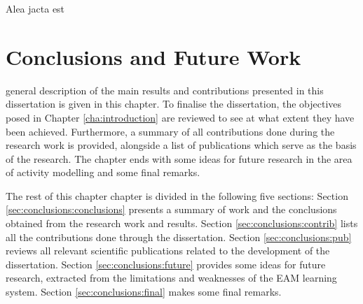

\begin{savequote}[50mm]
Alea jacta est
\end{savequote}


\chapter{Conclusions and Future Work}
\label{cha:conclusions}

\ifpdf
    \graphicspath{{7_conclusions/figures/PDF/}{7_conclusions/figures/PNG/}{7_conclusions/figures/}}
\else
    \graphicspath{{7_conclusions/figures/EPS/}{7_conclusions/figures/}}
\fi

 general description of the main results and contributions presented in this dissertation is given in this chapter. To finalise the dissertation, the objectives posed in Chapter \ref{cha:introduction} are reviewed to see at what extent they have been achieved. Furthermore, a summary of all contributions done during the research work is provided, alongside a list of publications which serve as the basis of the research. The chapter ends with some ideas for future research in the area of activity modelling and some final remarks.

The rest of this chapter chapter is divided in the following five sections: Section \ref{sec:conclusions:conclusions} presents a summary of work and the conclusions obtained from the research work and results. Section \ref{sec:conclusions:contrib} lists all the contributions done through the dissertation. Section \ref{sec:conclusions:pub} reviews all relevant scientific publications related to the development of the dissertation. Section \ref{sec:conclusions:future} provides some ideas for future research, extracted from the limitations and weaknesses of the EAM learning system. Section \ref{sec:conclusions:final} makes some final remarks.